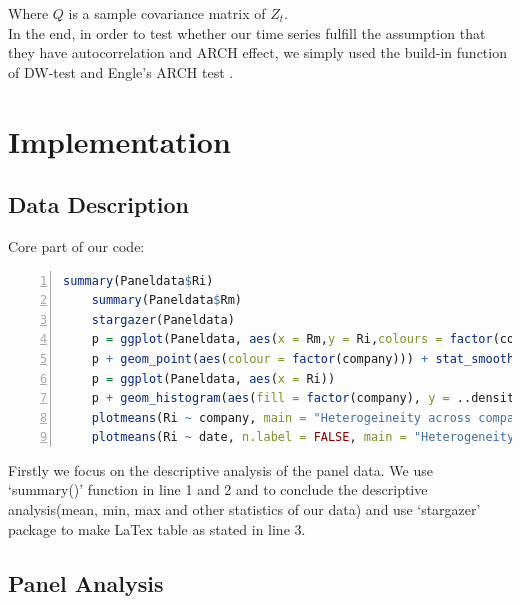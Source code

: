     Where $Q$ is a sample covariance matrix of $Z_{t}$.\\
    [\baselineskip] \indent In the end, in order to test whether our time series fulfill the assumption that they have autocorrelation and ARCH effect, we simply used the build-in function of DW-test \citep{durbin1950testing,durbin1951testing} and Engle's ARCH test \citep{engle1982autoregressive}.\\
    \newpage
    \pagestyle{fancy}
    \section{Implementation}
    \subsection{Data Description}
    \noindent Core part of our code:\\
    \begin{lstlisting}[language=R,numbers=left, numberstyle=\normalsize]
    summary(Paneldata$Ri)
    summary(Paneldata$Rm)
    stargazer(Paneldata)
    p = ggplot(Paneldata, aes(x = Rm,y = Ri,colours = factor(company)))
    p + geom_point(aes(colour = factor(company))) + stat_smooth()
    p = ggplot(Paneldata, aes(x = Ri))
    p + geom_histogram(aes(fill = factor(company), y = ..density..), alpha = 0.3, colour = "blue") +  stat_density(geom = "line", position = "identity", size = 1.5, aes(colour = factor(company))) + facet_wrap(~company, ncol = 1)
    plotmeans(Ri ~ company, main = "Heterogeineity across companies", data = Paneldata)
    plotmeans(Ri ~ date, n.label = FALSE, main = "Heterogeneity across time", data = Paneldata)
    \end{lstlisting}

    \noindent Firstly we focus on the descriptive analysis of the panel data. We use `summary()' function in line 1 and 2 and to conclude the descriptive analysis(mean, min, max and other statistics of our data) and use `stargazer' package to make LaTex table as stated in line 3.\\


    \subsection{Panel Analysis}
